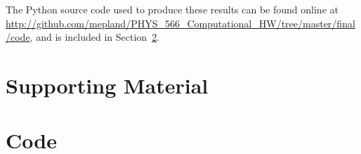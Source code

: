 \documentclass[notitlepage,aps,prd,nofootinbib]{revtex4-1}
\begin{document}
The Python source code used to produce these results can be found online at \url{http://github.com/mepland/PHYS_566_Computational_HW/tree/master/final/code}, and is included in Section~\ref{sec:code}.


\section{Supporting Material}
\label{sec:Supporting_Material}





\clearpage


\clearpage
\section{Code}
\label{sec:code}




\end{document}
